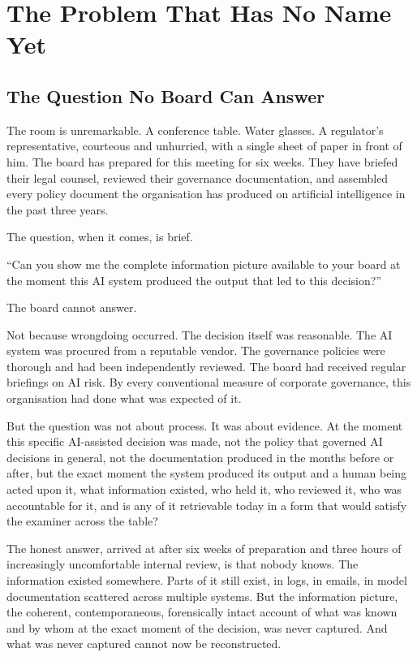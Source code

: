 
\part{The Problem That Has No Name Yet}

\chapter{The Question No Board Can Answer}

The room is unremarkable. A conference table. Water glasses. A regulator's representative, courteous and unhurried, with a single sheet of paper in front of him. The board has prepared for this meeting for six weeks. They have briefed their legal counsel, reviewed their governance documentation, and assembled every policy document the organisation has produced on artificial intelligence in the past three years.

The question, when it comes, is brief.

``Can you show me the complete information picture available to your board at the moment this AI system produced the output that led to this decision?''

The board cannot answer.

Not because wrongdoing occurred. The decision itself was reasonable. The AI system was procured from a reputable vendor. The governance policies were thorough and had been independently reviewed. The board had received regular briefings on AI risk. By every conventional measure of corporate governance, this organisation had done what was expected of it.

But the question was not about process. It was about evidence. At the moment this specific AI-assisted decision was made, not the policy that governed AI decisions in general, not the documentation produced in the months before or after, but the exact moment the system produced its output and a human being acted upon it, what information existed, who held it, who reviewed it, who was accountable for it, and is any of it retrievable today in a form that would satisfy the examiner across the table?

The honest answer, arrived at after six weeks of preparation and three hours of increasingly uncomfortable internal review, is that nobody knows. The information existed somewhere. Parts of it still exist, in logs, in emails, in model documentation scattered across multiple systems. But the information picture, the coherent, contemporaneous, forensically intact account of what was known and by whom at the exact moment of the decision, was never captured. And what was never captured cannot now be reconstructed.

